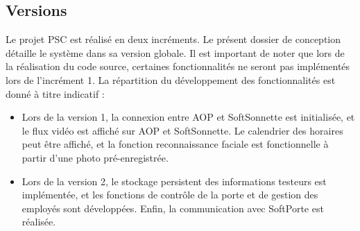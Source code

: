 \newpage
\subsection{Versions}

Le projet PSC est réalisé en deux incréments. 
Le présent dossier de conception détaille le système dans sa version globale. 
Il est important de noter que lors de la réalisation du code source, certaines fonctionnalités ne seront pas implémentés lors de l'incrément 1.
La répartition du développement des fonctionnalités est donné à titre indicatif :
\begin{itemize}
    \item Lors de la version 1, la connexion entre AOP et SoftSonnette est initialisée, et le flux vidéo est affiché sur AOP et SoftSonnette.
    Le calendrier des horaires peut être affiché, et la fonction reconnaissance faciale est fonctionnelle à partir d'une photo pré-enregistrée.
    \item Lors de la version 2, le stockage persistent des informations testeurs est implémentée, et les fonctions de contrôle de la porte et de gestion des employés sont développées.
    Enfin, la communication avec SoftPorte est réalisée.
\end{itemize}